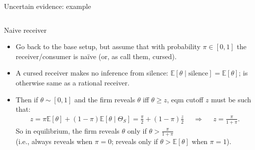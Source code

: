 \documentclass[english,10pt
,aspectratio=169
]{beamer}
\begin{document}
\begin{frame}{Uncertain evidence: example}
\begin{columns}
\begin{column}{0.4\linewidth}
	\end{column}
\end{columns}
\end{frame}


\begin{frame}{Naive receiver \citep{milgrom_relying_1986}}
\begin{itemize}
	\item Go back to the base setup, but assume that with probability $\pi \in [0,1]$ the receiver/consumer is \alert{na{\"i}ve} (or, as \cite{eyster_cursed_2005} call them, \alert{cursed}).
	
	\item A cursed receiver makes no inference from silence: $\mathbb{E}[\theta \mid \text{silence} ] = \mathbb{E}[\theta]$; is otherwise same as a rational receiver.
	
	\pause \bigskip 
	\item Then if $\theta \sim [0,1]$ and the firm reveals $\theta$ iff $\theta \geq z$, eqm cutoff $z$ must be such that:
	\begin{align*}
		z = \pi \mathbb{E}[\theta] + (1-\pi) \mathbb{E}[\theta \mid \Theta_S] = \frac{\pi}{2} + (1-\pi)\frac{z}{2}
		&& \Rightarrow &&
		z = \frac{\pi}{1+\pi}.
	\end{align*}
	So in equilibrium, the firm reveals $\theta$ only if $\theta > \frac{\pi}{1+\pi}$ \\
	(i.e., always reveals when $\pi=0$; reveals only if $\theta>\mathbb{E}[\theta]$ when $\pi=1$).
\end{itemize}
\end{frame}
\end{document}
